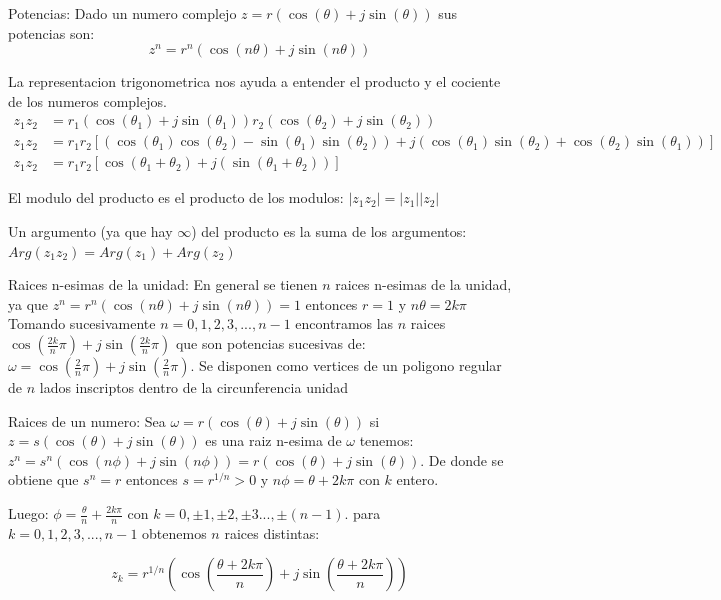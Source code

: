 \begin{defi}{Potencias:}
   Dado un numero complejo $z=r(\cos(\theta)+j\sin(\theta))$ sus potencias son:
   \begin{equation}
      z^{n} = r^{n}(\cos(n\theta)+j\sin(n\theta))
   \end{equation}
\end{defi}


La representacion trigonometrica nos ayuda a entender el producto y el cociente de los numeros complejos.
\begin{align}
   z_{1}z_{2} &= r_{1}(\cos(\theta_{1})+j\sin(\theta_1))r_{2}(\cos(\theta_{2})+j\sin(\theta_{2}))\\
   z_{1}z_{2} &= r_{1}r_{2}[(\cos(\theta_1)\cos(\theta_2)-\sin(\theta_1)\sin(\theta_2))+j(\cos(\theta_1)\sin(\theta_2)+\cos(\theta_2)\sin(\theta_1))]\\
   z_{1}z_{2} &= r_{1}r_{2}[\cos(\theta_1 + \theta_2)+j(\sin(\theta_1 + \theta_2))]
\end{align}

\begin{defi}
   El modulo del producto es el producto de los modulos: $|z_1 z_2|=|z_1||z_2|$
\end{defi}

\begin{defi}
   Un argumento (ya que hay $\infty$) del producto es la suma de los argumentos: $Arg(z_1 z_2)=Arg(z_1)+Arg(z_2)$
\end{defi}

\begin{defi}{Raices n-esimas de la unidad:}
   En general se tienen $n$ raices n-esimas de la unidad, ya que $z^{n} = r^{n}(\cos(n\theta)+j\sin(n\theta))=1$ entonces $r=1$ y $n\theta=2k\pi$
   Tomando sucesivamente $n=0,1,2,3,...,n-1$ encontramos las $n$ raices $\cos(\frac{2k}{n}\pi)+j\sin(\frac{2k}{n}\pi)$ que son potencias sucesivas de:
   $\omega = \cos(\frac{2}{n}\pi)+j\sin(\frac{2}{n}\pi)$. Se disponen como vertices de un poligono regular de $n$ lados inscriptos dentro de la circunferencia unidad
\end{defi}

\begin{defi}{Raices de un numero:}
   Sea $\omega=r(\cos(\theta)+j\sin(\theta))$ si $z=s(\cos(\theta)+j\sin(\theta))$ es una raiz n-esima de $\omega$ tenemos:
   $z^{n}=s^{n}(\cos(n\phi)+j\sin(n\phi))=r(\cos(\theta)+j\sin(\theta))$. De donde se obtiene que $s^{n}=r$ entonces $s=r^{1/n}>0$ y 
   $n\phi=\theta + 2k\pi$ con $k$ entero.
   
   Luego: $\phi=\frac{\theta}{n}+\frac{2k\pi}{n}$ con $k=0,\pm 1,\pm 2,\pm 3...,\pm (n-1)$. para $k=0,1,2,3,...,n-1$ obtenemos $n$ raices distintas:

   \begin{equation}
      z_{k}=r^{1/n}(\cos(\frac{\theta + 2k\pi}{n})+j\sin(\frac{\theta + 2k\pi}{n}))
   \end{equation}
\end{defi}
